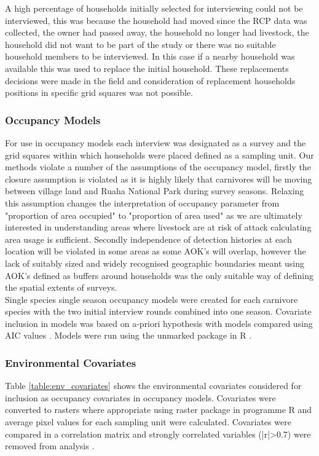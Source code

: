 A high percentage of households initially selected for interviewing could not be interviewed, this was because the household had moved since the RCP data was collected, the owner had passed away, the household no longer had livestock, the household did not want to be part of the study or there was no suitable household members to be interviewed. In this case if a nearby household was available this was used to replace the initial household. These replacements decisions were made in the field and consideration of replacement households positions in specific grid squares was not possible.

\subsubsection*{Occupancy Models}
For use in occupancy models each interview was designated as a survey and the grid squares within which households were placed defined as a sampling unit. Our methods violate a number of the assumptions of the occupancy model, firstly the closure assumption is violated as it is highly likely that carnivores will be moving between village land and Ruaha National Park during survey seasons. Relaxing this assumption changes the interpretation of occupancy parameter from "proportion of area occupied" to "proportion of area used" \cite{MacKenzie2004} as we are ultimately interested in understanding areas where livestock are at risk of attack calculating area usage is sufficient. Secondly independence of detection histories at each location will be violated in some areas as some AOK's will overlap, however the lack of suitably sized and widely recognised geographic boundaries meant using AOK's defined as buffers around households was the only suitable way of defining the spatial extents of surveys.\\

Single species single season occupancy models were created for each carnivore species with the two initial interview rounds combined into one season. Covariate inclusion in models was based on a-priori hypothesis with models compared using AIC values \cite{Burnham2002}. Models were run using the unmarked package \cite{Fiske2011} in R \cite{RCoreTeam2015}.\\

\subsubsection*{Environmental Covariates}
Table \ref{table:env_covariates} shows the environmental covariates considered for inclusion as occupancy covariates in occupancy models. Covariates were converted to rasters where appropriate using raster package \cite{Hijmans2014} in programme R \cite{RCoreTeam2015} and average pixel values for each sampling unit were calculated. Covariates were compared in a correlation matrix and strongly correlated variables (|r|>0.7) were removed from analysis \cite{Dormann2013}.

